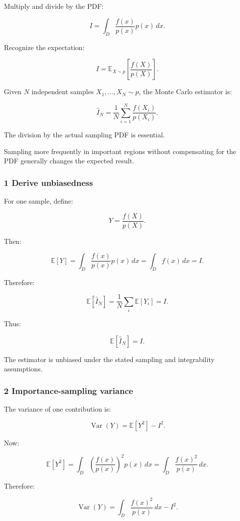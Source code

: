 Multiply and divide by the PDF:

\[
 I= \int_D \frac{f(x)}{p(x)}p(x)\,dx.
\]

Recognize the expectation:

\[
 \boxed{ I= \mathbb E_{X\sim p} \left[ \frac{f(X)}{p(X)} \right] }.
\]

Given \(N\) independent samples \(X_1,\ldots,X_N\sim p\), the Monte Carlo estimator is:

\[
 \boxed{ \widehat I_N= \frac1N\sum_{i=1}^{N} \frac{f(X_i)}{p(X_i)} }.
\]

The division by the actual sampling PDF is essential.

Sampling more frequently in important regions without compensating for the PDF generally changes the expected result.

\subsubsection{1 Derive unbiasedness}\label{02-foundations-ii-ch029-derive-unbiasedness}

For one sample, define:

\[
 Y=\frac{f(X)}{p(X)}.
\]

Then:

\[
 \mathbb E[Y] = \int_D \frac{f(x)}{p(x)}p(x)\,dx = \int_Df(x)\,dx =I.
\]

Therefore:

\[
 \mathbb E[\widehat I_N] = \frac1N\sum_i\mathbb E[Y_i] =I.
\]

Thus:

\[
 \boxed{ \mathbb E[\widehat I_N]=I }.
\]

The estimator is unbiased under the stated sampling and integrability assumptions.

\subsubsection{2 Importance-sampling variance}\label{02-foundations-ii-ch029-importance-sampling-variance}

The variance of one contribution is:

\[
 \operatorname{Var}(Y) = \mathbb E[Y^2]-I^2.
\]

Now:

\[
 \mathbb E[Y^2] = \int_D \left(\frac{f(x)}{p(x)}\right)^2p(x)\,dx = \int_D\frac{f(x)^2}{p(x)}\,dx.
\]

Therefore:

\[
 \boxed{ \operatorname{Var}(Y) = \int_D\frac{f(x)^2}{p(x)}\,dx-I^2 }.
\]


